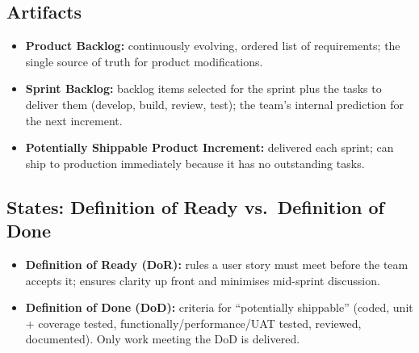\documentclass[hidelinks]{article}
\begin{document}
\subsection{Artifacts}
\begin{itemize}
  \item \textbf{Product Backlog:} continuously evolving, ordered list of requirements; the single
        source of truth for product modifications.
  \item \textbf{Sprint Backlog:} backlog items selected for the sprint plus the tasks to deliver
        them (develop, build, review, test); the team's internal prediction for the next increment.
  \item \textbf{Potentially Shippable Product Increment:} delivered each sprint; can ship to
        production immediately because it has no outstanding tasks.
\end{itemize}

\subsection{States: Definition of Ready vs.\ Definition of Done}
\begin{itemize}
  \item \textbf{Definition of Ready (DoR):} rules a user story must meet before the team accepts
        it; ensures clarity up front and minimises mid-sprint discussion.
  \item \textbf{Definition of Done (DoD):} criteria for ``potentially shippable'' (coded, unit +
        coverage tested, functionally/performance/UAT tested, reviewed, documented). Only work
        meeting the DoD is delivered.
\end{itemize}
\end{document}
